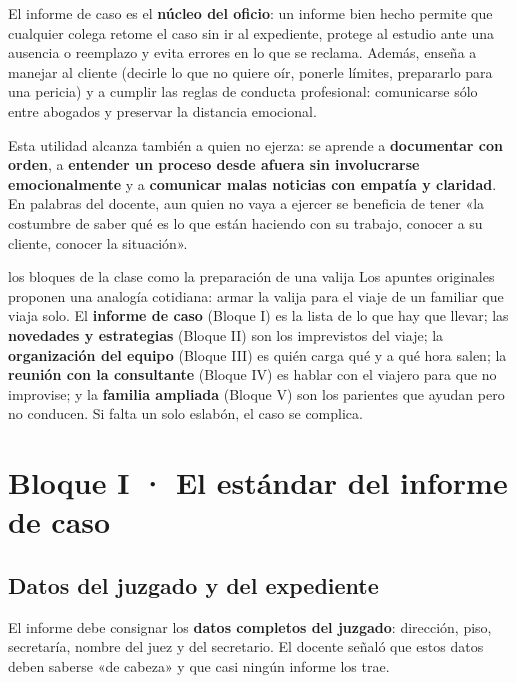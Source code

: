 \documentclass[12pt,oneside]{book}
\begin{document}
El informe de caso es el \textbf{núcleo del oficio}: un informe bien hecho permite que cualquier colega retome el caso sin ir al expediente, protege al estudio ante una ausencia o reemplazo y evita errores en lo que se reclama. Además, enseña a manejar al cliente (decirle lo que no quiere oír, ponerle límites, prepararlo para una pericia) y a cumplir las reglas de conducta profesional: comunicarse sólo entre abogados y preservar la distancia emocional.

Esta utilidad alcanza también a quien no ejerza: se aprende a \textbf{documentar con orden}, a \textbf{entender un proceso desde afuera sin involucrarse emocionalmente} y a \textbf{comunicar malas noticias con empatía y claridad}. En palabras del docente, aun quien no vaya a ejercer se beneficia de tener «la costumbre de saber qué es lo que están haciendo con su trabajo, conocer a su cliente, conocer la situación».

\begin{example}{los bloques de la clase como la preparación de una valija}
Los apuntes originales proponen una analogía cotidiana: armar la valija para el viaje de un familiar que viaja solo. El \textbf{informe de caso} (Bloque I) es la lista de lo que hay que llevar; las \textbf{novedades y estrategias} (Bloque II) son los imprevistos del viaje; la \textbf{organización del equipo} (Bloque III) es quién carga qué y a qué hora salen; la \textbf{reunión con la consultante} (Bloque IV) es hablar con el viajero para que no improvise; y la \textbf{familia ampliada} (Bloque V) son los parientes que ayudan pero no conducen. Si falta un solo eslabón, el caso se complica.
\end{example}

\chapter[Informe de caso]{Bloque I · El estándar del informe de caso}

\section{Datos del juzgado y del expediente}

El informe debe consignar los \textbf{datos completos del juzgado}: dirección, piso, secretaría, nombre del juez y del secretario. El docente señaló que estos datos deben saberse «de cabeza» y que casi ningún informe los trae.
\end{document}
